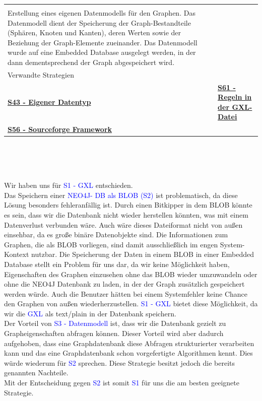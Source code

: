 \documentclass[enabledeprecatedfontcommands,fontsize=11pt,paper=a4,twoside]{scrartcl}
\newcounter{one}
\newcommand{\cb}[1]{{\textcolor{blue}{#1}}}
\begin{document}
\begin{tabular} {|p{8cm} p{8cm}|}
{{				\textbf{S3 - Datenmodell}: \\
				Erstellung eines eigenen Datenmodells für den Graphen. Das Datenmodell dient der Speicherung der Graph-Bestandteile (Sphären, Knoten und Kanten), deren Werten sowie der Beziehung der Graph-Elemente zueinander. Das Datenmodell wurde auf eine Embedded Database ausgelegt werden, in der dann dementsprechend der Graph abgespeichert wird.
		} }\\ [11ex] \hline
		\multicolumn{2}{|l|}{Verwandte Strategien} \\
		\textbf{\hyperlink {ooo}{S43 - Eigener Datentyp}}&
		\textbf{\hyperlink {vvv}{S61 - Regeln in der GXL-Datei}} \\
		\textbf{\hyperlink {ttt}{S56 - Sourceforge Framework}}&
		\\\hline
	\end{tabular}\\ \\ \\
	\begin{onehalfspace}
		Wir haben uns für \cb{S1 - GXL} entschieden. \\ 
		Das Speichern einer \cb{NEO4J- DB als BLOB (S2)} ist problematisch, da diese Lösung besonders fehleranfällig ist. Durch einen Bitkipper in dem BLOB könnte es sein, dass wir die Datenbank nicht wieder herstellen könnten, was mit einem Datenverlust verbunden wäre. Auch wäre dieses Dateiformat nicht von \glqq außen\grqq{} einsehbar, da es große binäre Datenobjekte sind. Die Informationen zum Graphen, die als BLOB vorliegen, sind damit ausschließlich im engen System-Kontext nutzbar. Die Speicherung der Daten in einem BLOB in einer Embedded Database stellt ein Problem für uns dar, da wir keine Möglichkeit haben, Eigenschaften des Graphen einzusehen ohne das BLOB wieder umzuwandeln oder ohne die NEO4J Datenbank zu laden, in der der Graph zusätzlich gespeichert werden würde. Auch die Benutzer hätten bei einem Systemfehler keine Chance den Graphen von \glqq außen\grqq{} wiederherzustellen. \cb{S1 - GXL} bietet diese Möglichkeit, da wir die \cb{GXL} als text/plain in der Datenbank speichern. \\ 
		Der Vorteil von \cb{S3 - Datenmodell} ist, dass wir die Datenbank gezielt zu Grapheigenschaften abfragen können. Dieser Vorteil wird aber dadurch aufgehoben, dass eine Graphdatenbank diese Abfragen strukturierter verarbeiten kann und das eine Graphdatenbank schon vorgefertigte Algorithmen kennt. Dies würde wiederum für \cb{S2} sprechen. Diese Strategie besitzt jedoch die bereits genannten Nachteile. \\
		Mit der Entscheidung gegen \cb{S2} ist somit \cb{S1} für uns die am besten geeignete Strategie.
	\end{onehalfspace}
\end{document}
